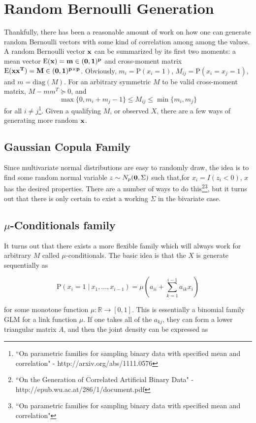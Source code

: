 \documentclass[11pt]{article}
\newcommand{\R}{\mathbb{R}}
\newcommand{\p}{\mathrm{P}}
\newcommand{\E}{\mathrm{E}}
\newcommand{\diag}{\mathrm{diag}}
\newcommand{\st}{ \; \big | \:}
\theoremstyle{definition}
\begin{document}
\section{Random Bernoulli Generation}
    Thankfully, there has been a reasonable amount of work on how one can generate random Bernoulli vectors with some kind of correlation among among the values. A random Bernoulli vector $\bf x$ can be summarized by its first two moments: a mean vector $\E(\bf x)=m\in(0,1)^p$ and cross-moment matrix $\E(\bf x\bf x^T)=M\in(0,1)^{p\times p}$. Obviously, $m_i = \p(x_i=1)$, $M_{ij} = \p(x_i=x_j=1)$, and $m=\diag(M)$. For an arbitrary symmetric $M$ to be valid cross-moment matrix, $M-mm^T\succeq0$, and
    \[ \max\{0,m_i+m_j -1\} \leq M_{ij} \leq \min\{m_i,m_j\}\]
    for all $i\neq j$\footnote{``On parametric families for sampling binary data with specified mean and correlation" - http://arxiv.org/abs/1111.0576}. Given a qualifying $M$, or observed $X$, there are a few ways of generating more random $\bf x$.

\subsection{Gaussian Copula Family}
    Since multivariate normal distributions are easy to randomly draw, the idea is to find some random normal variable $z\sim N_p({\bf 0},\Sigma)$ such that,for $x_i = I(z_i<0)$, $x$ has the desired properties. There are a number of ways to do this\footnote{``On the Generation of Correlated Artificial Binary Data" - http://epub.wu.ac.at/286/1/document.pdf}\footnote{``On parametric families for sampling binary data with specified mean and correlation"}, but it turns out that there is only certain to exist a working $\Sigma$ in the bivariate case. 

\subsection{$\mu$-Conditionals family}
    It turns out that there exists a more flexible family which will always work for arbitrary $M$ called $\mu$-conditionals. The basic idea is that the $X$ is generate sequentially as 

    \[ \p(x_{i}=1\st x_{1},...,x_{i-1}) = \mu\left(a_{ii}+\sum_{k=1}^{i-1}a_{ik}x_i\right) \]

    for some monotone function $\mu:\R\to[0,1]$. This is essentially a binomial family GLM for a link function $\mu$. If one takes all of the $a_{kj}$, they can form a lower triangular matrix $A$, and then the joint density can be expressed as 
\end{document}
